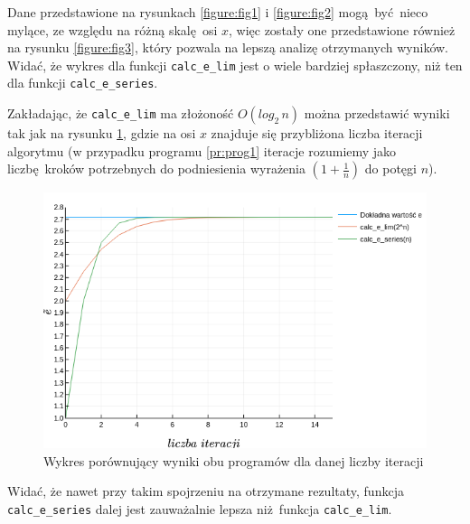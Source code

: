 \documentclass[12pt]{article}
\begin{document}
Dane przedstawione na rysunkach \ref{figure:fig1} i \ref{figure:fig2} mogą być nieco
mylące, ze względu na różną skalę osi $x$, więc zostały one przedstawione również
na rysunku \ref{figure:fig3}, który pozwala na lepszą analizę otrzymanych wyników.
Widać, że wykres dla funkcji \texttt{calc\_e\_lim} jest o wiele bardziej spłaszczony, niż
ten dla funkcji \texttt{calc\_e\_series}.

Zakładając, że \texttt{calc\_e\_lim} ma złożoność $O(log_2\,n)$ można przedstawić
wyniki tak jak na rysunku \ref{figure:fig4}, gdzie na osi $x$ znajduje się przybliżona
liczba iteracji algorytmu (w przypadku programu \ref{pr:prog1} iteracje rozumiemy
jako liczbę kroków potrzebnych do podniesienia wyrażenia $(1+\frac{1}{n})$ do potęgi $n$).

\begin{figure}[H]
    \centering
    \includegraphics[scale=0.75]{plot4.png}
\caption{Wykres porównujący wyniki obu programów dla danej liczby iteracji}
\label{figure:fig4}
\end{figure}

Widać, że nawet przy takim spojrzeniu na otrzymane rezultaty, funkcja 
\texttt{calc\_e\_series} dalej jest zauważalnie lepsza niż funkcja \texttt{calc\_e\_lim}.


{}

\end{document}
